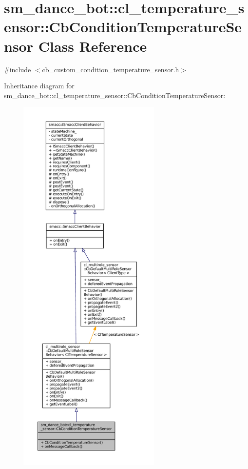 \hypertarget{classsm__dance__bot_1_1cl__temperature__sensor_1_1CbConditionTemperatureSensor}{}\section{sm\+\_\+dance\+\_\+bot\+:\+:cl\+\_\+temperature\+\_\+sensor\+:\+:Cb\+Condition\+Temperature\+Sensor Class Reference}
\label{classsm__dance__bot_1_1cl__temperature__sensor_1_1CbConditionTemperatureSensor}


{\ttfamily \#include $<$cb\+\_\+custom\+\_\+condition\+\_\+temperature\+\_\+sensor.\+h$>$}



Inheritance diagram for sm\+\_\+dance\+\_\+bot\+:\+:cl\+\_\+temperature\+\_\+sensor\+:\+:Cb\+Condition\+Temperature\+Sensor\+:
\nopagebreak
\begin{figure}[H]
\begin{center}
\leavevmode
\includegraphics[height=550pt]{classsm__dance__bot_1_1cl__temperature__sensor_1_1CbConditionTemperatureSensor__inherit__graph}
\end{center}
\end{figure}


